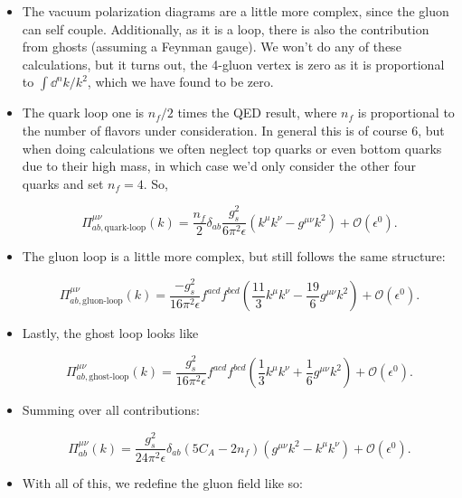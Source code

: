 \begin{itemize}
  
\item The vacuum polarization diagrams are a little more complex, since the gluon can self couple. Additionally, as it is a loop, there is also the contribution from ghosts (assuming a Feynman gauge). We won't do any of these calculations, but it turns out, the 4-gluon vertex is zero as it is proportional to $\int \dd^nk / k^2$, which we have found to be zero.
\item The quark loop one is $n_f/2$ times the QED result, where $n_f$ is proportional to the number of flavors under consideration. In general this is of course 6, but when doing calculations we often neglect top quarks or even bottom quarks due to their high mass, in which case we'd only consider the other four quarks and set $n_f=4$. So,

  \begin{equation}
    \Pi^{\mu\nu}_{ab,\text{quark-loop}}(k) = \frac{n_f}{2}\delta_{ab} \frac{g_s^2}{6\pi^2\epsilon}(k^\mu k^\nu - g^{\mu\nu}k^2) + \mathcal{O}(\epsilon^0).
  \end{equation}

\item The gluon loop is a little more complex, but still follows the same structure:

  \begin{equation}
    \Pi^{\mu\nu}_{ab,\text{gluon-loop}}(k) =  \frac{-g_s^2}{16\pi^2\epsilon} f^{acd}f^{bcd} (\frac{11}{3} k^\mu k^\nu - \frac{19}{6}g^{\mu\nu}k^2) + \mathcal{O}(\epsilon^0).
  \end{equation}

\item Lastly, the ghost loop looks like

  \begin{equation}
    \Pi^{\mu\nu}_{ab,\text{ghost-loop}}(k) =  \frac{g_s^2}{16\pi^2\epsilon} f^{acd}f^{bcd} (\frac{1}{3} k^\mu k^\nu + \frac{1}{6}g^{\mu\nu}k^2) + \mathcal{O}(\epsilon^0).
  \end{equation}

\item Summing over all contributions:

  \begin{equation}
    \Pi^{\mu\nu}_{ab}(k) =  \frac{g_s^2}{24\pi^2\epsilon}\delta_{ab}(5C_A - 2n_f) (g^{\mu\nu}k^2 - k^\mu k^\nu) + \mathcal{O}(\epsilon^0).
  \end{equation}

\item With all of this, we redefine the gluon field like so:


\end{itemize}
